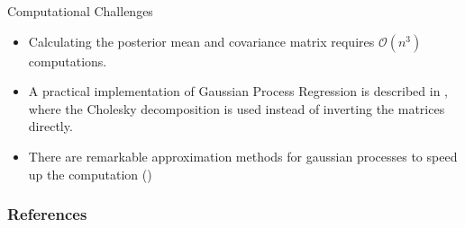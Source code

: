 \documentclass[10pt]{beamer}
\begin{document}
\begin{frame}{Computational Challenges}
\begin{itemize}
\item Calculating the posterior mean and covariance matrix requires $\mathcal{O}(n^3)$ computations. 
\item A practical implementation of Gaussian Process Regression is described in \cite[Algorithm 2.1]{RW05}, where the Cholesky decomposition is used instead of inverting the matrices directly. 
\item There are remarkable approximation methods for gaussian processes to speed up the computation (\cite[Chapter 20.1]{BDA13})
\end{itemize}
\end{frame}



\begin{frame}[t, allowframebreaks]
\frametitle{References}
\footnotesize{

 
}
\end{frame}
\end{document}
